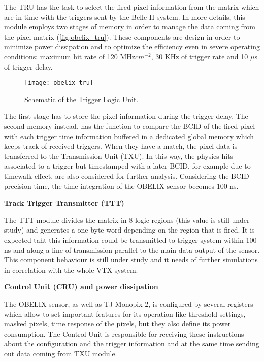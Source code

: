 The TRU has the task to select the fired pixel information from the matrix which are in-time with the triggers sent by the Belle II system. In more details, this module employs two stages of memory in order to manage the data coming from the pixel matrix (\autoref{fig:obelix_tru}). These components are design in order to minimize power dissipation and to optimize the efficiency even in severe operating conditions: maximum hit rate of 120 MHz$cm^{-2}$, 30 KHz of trigger rate and 10 $\mu$s of trigger delay.

\begin{figure}[h!]
\centering
\texttt{[image: obelix\_tru]}
\caption{Schematic of the Trigger Logic Unit.}
\label{fig:obelix_tru}
\end{figure}

The first stage has to store the pixel information during the trigger delay. The second memory instead, has the function to compare the BCID of the fired pixel with each trigger time information buffered in a dedicated global memory which keeps track of received triggers. When they have a match, the pixel data is transferred to the Transmission Unit (TXU). In this way, the physics hits associated to a trigger but timestamped with a later BCID, for example due to timewalk effect, are also considered for further analysis.
Considering the BCID precision time, the time integration of the OBELIX sensor becomes 100 ns.


\begin{description}
\item \textbf{Track Trigger Transmitter (TTT)}
\end{description}

The TTT module divides the matrix in 8 logic regions (this value is still under study) and generates a one-byte word depending on the region that is fired. It is expected taht this information could be transmitted to trigger system within 100 ns and along a line of transmission parallel to the main data output of the sensor. 
This component behaviour is still under study and it needs of further simulations in correlation with the whole VTX system.


\begin{description}
\item \textbf{Control Unit (CRU) and power dissipation}
\end{description}

The OBELIX sensor, as well as TJ-Monopix 2, is configured by several registers which allow to set important features for its operation like threshold settings, masked pixels, time response of the pixels, but they also define its power consumption. The Control Unit is responsible for receiving these instructions about the configuration and the trigger information and at the same time sending out data coming from TXU module.

